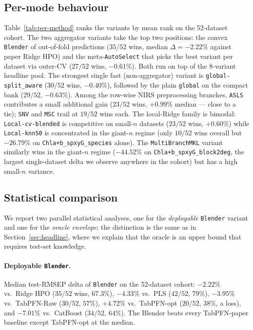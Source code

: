 \documentclass[11pt,a4paper]{article}
\begin{document}
\subsection{Per-mode behaviour}

Table~\ref{tab:per-method} ranks the variants by mean rank on the
52-dataset cohort. The two aggregator variants take the top two
positions: the convex \texttt{Blender} of out-of-fold predictions
($35/52$ wins, median $\Delta = -2.22\%$ against paper Ridge HPO) and
the meta-\texttt{AutoSelect} that picks the best variant per dataset
via outer-CV ($27/52$ wins, $-0.61\%$). Both run on top of the
8-variant headline pool. The strongest single fast (non-aggregator)
variant is \texttt{global-split\_aware} ($30/52$ wins, $-0.40\%$),
followed by the plain \texttt{global} on the compact bank ($29/52$,
$-0.63\%$). Among the row-wise NIRS preprocessing branches,
\texttt{ASLS} contributes a small additional gain ($23/52$ wins,
$+0.99\%$ median --- close to a tie); \texttt{SNV} and \texttt{MSC}
trail at $19/52$ wins each. The local-Ridge family is bimodal:
\texttt{Local-cv-blended} is competitive on small-$n$ datasets
($23/52$ wins, $+0.60\%$) while
\texttt{Local-knn50} is concentrated in the giant-$n$ regime
(only $10/52$ wins overall but $-26.79\%$ on
\texttt{Chla+b\_spxyG\_species} alone). The
\texttt{MultiBranchMKL} variant similarly wins in the giant-$n$
regime ($-44.52\%$ on \texttt{Chla+b\_spxyG\_block2deg}, the largest
single-dataset delta we observe anywhere in the cohort) but has a
high small-$n$ variance.

\subsection{Statistical comparison}

We report two parallel statistical analyses, one for the
\emph{deployable} \texttt{Blender} variant and one for the
\emph{oracle envelope}; the distinction is the same as in
Section~\ref{sec:headline}, where we explain that the oracle is an
upper bound that requires test-set knowledge.

\paragraph{Deployable \texttt{Blender}.}
Median test-RMSEP delta of \texttt{Blender} on the 52-dataset
cohort: $-2.22\%$ vs.\ Ridge HPO ($35/52$ wins, $67.3\%$),
$-4.33\%$ vs.\ PLS ($42/52$, $79\%$), $-3.95\%$ vs.\ TabPFN-Raw
($30/52$, $57\%$), $+4.72\%$ vs.\ TabPFN-opt ($20/52$, $38\%$, a
loss), and $-7.01\%$ vs.\ CatBoost ($34/52$, $64\%$). The Blender
beats every TabPFN-paper baseline except TabPFN-opt at the median.
\end{document}
